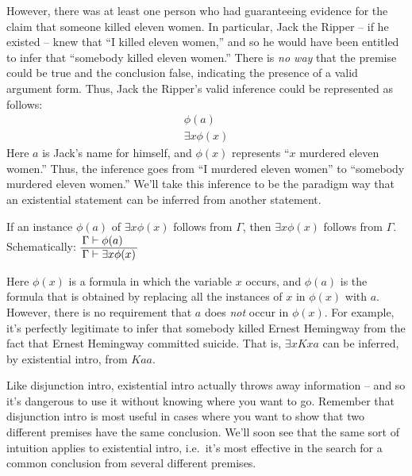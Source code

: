 However, there was at least one person who had guaranteeing evidence
for the claim that someone killed eleven women.  In particular, Jack
the Ripper -- if he existed -- knew that ``I killed eleven women,''
and so he would have been entitled to infer that ``somebody killed
eleven women.''  There is {\it no way} that the premise could be true
and the conclusion false, indicating the presence of a valid argument
form.  Thus, Jack the Ripper's valid inference could be represented as
follows:
\[ \begin{array}{c} \phi (a) \\ \hline \exists x\phi
    (x) \end{array} \] Here $a$ is Jack's name for himself, and
$\phi (x)$ represents ``$x$ murdered eleven women.''  Thus, the
inference goes from ``I murdered eleven women'' to ``somebody murdered
eleven women.''  We'll take this inference to be the paradigm way that
an existential statement can be inferred from another statement.
\bigskip \begin{tcolorbox}[enhanced,width=10cm,title=Existential
  Introduction (EI),attach boxed title to top
  left={yshift=-2mm,xshift=4mm},boxed title style={sharp corners}] If
  an instance $\phi (a)$ of $\exists x\phi (x)$ follows from $\Gamma$,
  then $\exists x\phi (x)$ follows from $\Gamma$.  Schematically:
$\arraycolsep=1.4pt \begin{array}{r c l}     \Gamma & \vdash & \phi (a) \\
     \hline
     \Gamma & \vdash & \exists x\phi (x) \end{array} $
\end{tcolorbox} \bigskip
\noindent Here $\phi (x)$ is a formula in which the variable $x$ occurs, and
$\phi (a)$ is the formula that is obtained by replacing all the
instances of $x$ in $\phi (x)$ with $a$.  However, there is no requirement that $a$ does
{\it not} occur in $\phi (x)$.  For example, it's perfectly legitimate
to infer that somebody killed Ernest Hemingway from the fact that
Ernest Hemingway committed suicide.  That is, $\exists xKxa$ can be
inferred, by existential intro, from $Kaa$.  

Like disjunction intro, existential intro actually throws away
information -- and so it's dangerous to use it without knowing where
you want to go.  Remember that disjunction intro is most useful in
cases where you want to show that two different premises have the same
conclusion.  We'll soon see that the same sort of intuition applies to
existential intro, i.e.\ it's most effective in the search for a
common conclusion from several different premises. 

